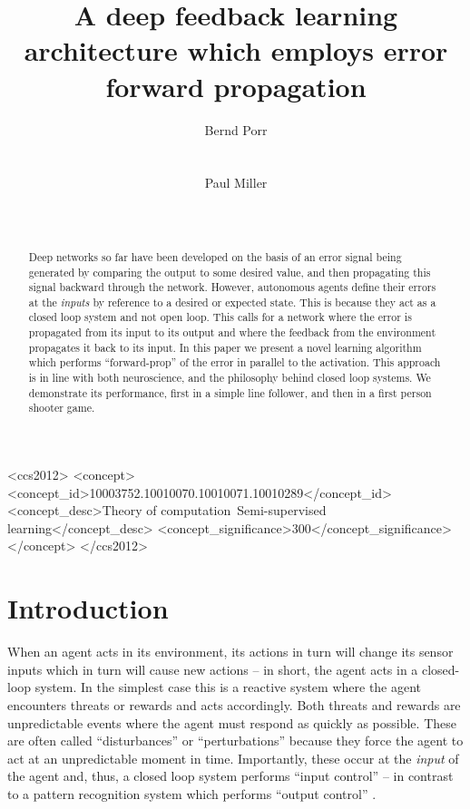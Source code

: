 \documentclass{aamas2018}
\title{A deep feedback learning architecture which employs error forward propagation}
\author{
%
\alignauthor
Bernd Porr\\
       \affaddr{Glasgow Neuro LTD}\\
       \affaddr{Glasgow, United Kingdom}\\
       \email{bernd@glasgowneuro.tech}
\alignauthor
Paul Miller\\
       \affaddr{Glasgow Neuro LTD}\\
       \affaddr{Glasgow, United Kingdom}\\
       \email{paul@glasgowneuro.tech}
}
\begin{document}
\maketitle

\begin{abstract}
  Deep networks so far have been developed on the basis of an error
  signal being generated by comparing the output to some desired
  value, and then propagating this signal backward through the
  network. However, autonomous agents define their errors at the
  \textsl{inputs} by reference to a desired or expected state. This is
  because they act as a closed loop system and not open loop. This
  calls for a network where the error is propagated from its input to
  its output and where the feedback from the environment propagates it
  back to its input. In this paper we present a novel learning
  algorithm which performs ``forward-prop'' of the error in parallel
  to the activation. This approach is in line with both neuroscience,
  and the philosophy behind closed loop systems. We demonstrate its
  performance, first in a simple line follower, and then in a first
  person shooter game.
\end{abstract}


 \begin{CCSXML}
<ccs2012>
<concept>
<concept_id>10003752.10010070.10010071.10010289</concept_id>
<concept_desc>Theory of computation~Semi-supervised learning</concept_desc>
<concept_significance>300</concept_significance>
</concept>
</ccs2012>
\end{CCSXML}



\printccsdesc





\section{Introduction}
When an agent acts in its environment, its actions in turn will change
its sensor inputs which in turn will cause new actions -- in short,
the agent acts in a closed-loop system. In the simplest case this is a
reactive system where the agent encounters threats or rewards and acts
accordingly. Both threats and rewards are unpredictable events where
the agent must respond as quickly as possible. These are often called
``disturbances'' \cite{Phillips2000} or
``perturbations'' because they force the agent to
act at an unpredictable moment in time. Importantly, these occur at
the \textsl{input} of the agent and, thus, a closed loop system
performs ``input control'' \cite{Phillips2000} -- in contrast to a pattern recognition
system which performs ``output control''
\cite{Phillips2000,Porr2005kyb}.
\end{document}
